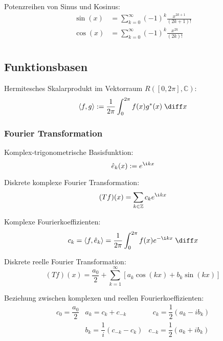 \documentclass[11pt]{article}
\numberwithin{equation}{section}
\begin{document}
          Potenzreihen von Sinus und Kosinus:
          \begin{equation}
            \begin{aligned}
              \sin(x) &= \sum_{k=0}^\infty (-1)^k \frac{x^{2k+1}}{(2k+1)!} \\
              \cos(x) &= \sum_{k=0}^\infty (-1)^k \frac{x^{2k}}{(2k)!} \\
            \end{aligned}
          \end{equation}

    \subsection{Funktionsbasen}
      Hermitesches Skalarprodukt im Vektorraum $R([0,2\pi],\mathbb{C})$:
      \begin{equation}
        \left<f,g\right>:=\frac{1}{2\pi}\int_0^{2\pi} f(x)g^* (x)\;\diff x
      \end{equation}

      \subsubsection{Fourier Transformation}
        Komplex-trigonometrische Basisfunktion:
        \begin{equation}
          \hat{e}_k(x):=e^{\i kx}
        \end{equation}

        Diskrete komplexe Fourier Transformation:
        \begin{equation}
          (Tf)(x)=\sum_{k\in\mathbb{Z}}c_k e^{\i kx}
        \end{equation}

        Komplexe Fourierkoeffizienten:
        \begin{equation}
          c_k = \left<f,\hat{e}_k\right>=\frac{1}{2\pi}\int_0^{2\pi}f(x)e^{-\i kx}\;\diff x
        \end{equation}

        Diskrete reelle Fourier Transformation:
        \begin{equation}
          (Tf)(x)=\frac{a_0}{2}+\sum_{k=1}^{\infty}\left[a_k \cos(kx) + b_k \sin(kx) \right]
        \end{equation}

        Beziehung zwischen komplexen und reellen Fourierkoeffizienten:
        \begin{equation}
          \begin{array}{clc}
            c_0 = \dfrac{a_0}{2} & a_k = c_k+c_{-k} & \phantom{_{-}}c_k = \dfrac{1}{2}\left(a_k-ib_k\right) \\ [6pt]
            & b_k = \dfrac{1}{i}\left(c_{-k}-c_{k}\right) & c_{-k} = \dfrac{1}{2}\left(a_k+ib_k\right) \\
          \end{array}
        \end{equation}
\end{document}
